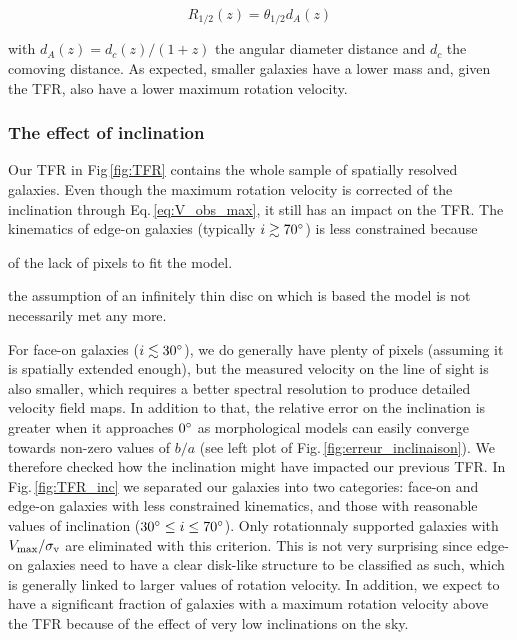 \begin{equation}
	R_{1/2}(z) = \theta_{1/2} d_A (z)
	\label{eq:TFR_phys_size}
\end{equation}

with $d_A (z) = d_c(z) / (1+z)$ the angular diameter distance and $d_c$ the comoving distance. As expected, smaller galaxies have a lower mass and, given the TFR, also have a lower maximum rotation velocity.

\subsubsection{The effect of inclination}

Our TFR in Fig\,\ref{fig:TFR} contains the whole sample of spatially resolved galaxies. Even though the maximum rotation velocity is corrected of the inclination through Eq.\,\ref{eq:V_obs_max}, it still has an impact on the TFR. The kinematics of edge-on galaxies (typically $i \gtrsim 70\degree$) is less constrained because
\begin{enumerate*}[label=(\alph*)]
	\item of the lack of pixels to fit the model.
	\item the assumption of an infinitely thin disc on which is based the model is not necessarily met any more.
\end{enumerate*}
For face-on galaxies ($i \lesssim 30\degree$), we do generally have plenty of pixels (assuming it is spatially extended enough), but the measured velocity on the line of sight is also smaller, which requires a better spectral resolution to produce detailed velocity field maps. In addition to that, the relative error on the inclination is greater when it approaches $0\degree$ as morphological models can easily converge towards non-zero values of $b/a$ (see left plot of Fig.\,\ref{fig:erreur_inclinaison}). We therefore checked how the inclination might have impacted our previous TFR. In Fig.\,\ref{fig:TFR_inc} we separated our galaxies into two categories: face-on and edge-on galaxies with less constrained kinematics, and those with reasonable values of inclination ($30\degree \leq i \leq 70\degree$). Only rotationnaly supported galaxies with $V_{\rm{max}} / \sigma_{\rm{v}}$ are eliminated with this criterion. This is not very surprising since edge-on galaxies need to have a clear disk-like structure to be classified as such, which is generally linked to larger values of rotation velocity. In addition, we expect to have a significant fraction of galaxies with a maximum rotation velocity above the TFR because of the effect of very low inclinations on the sky.


